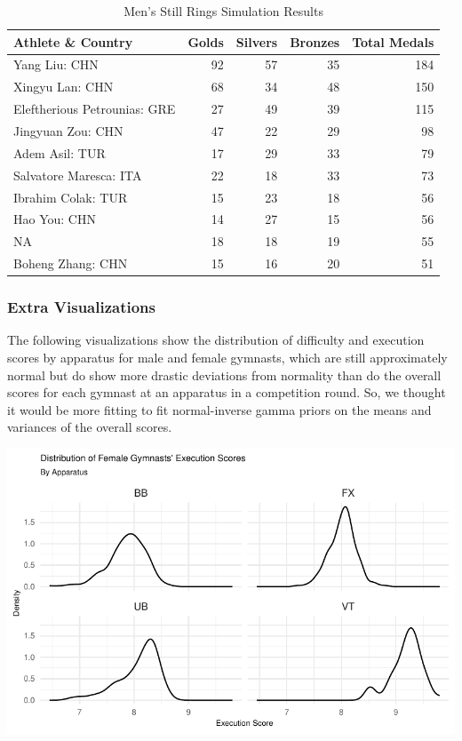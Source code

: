 \documentclass[
  letterpaper,
  DIV=11,
  numbers=noendperiod]{scrartcl}
\begin{document}
\begin{table}[H]

\caption{Men's Still Rings Simulation Results }
\centering
\fontsize{9}{11}\selectfont
\begin{tabular}[t]{l|r|r|r|r}
\hline
Athlete \& Country & Golds & Silvers & Bronzes & Total Medals\\
\hline
Yang Liu: CHN & 92 & 57 & 35 & 184\\
\hline
Xingyu Lan: CHN & 68 & 34 & 48 & 150\\
\hline
Eleftherious Petrounias: GRE & 27 & 49 & 39 & 115\\
\hline
Jingyuan Zou: CHN & 47 & 22 & 29 & 98\\
\hline
Adem Asil: TUR & 17 & 29 & 33 & 79\\
\hline
Salvatore Maresca: ITA & 22 & 18 & 33 & 73\\
\hline
Ibrahim Colak: TUR & 15 & 23 & 18 & 56\\
\hline
Hao You: CHN & 14 & 27 & 15 & 56\\
\hline
NA & 18 & 18 & 19 & 55\\
\hline
Boheng Zhang: CHN & 15 & 16 & 20 & 51\\
\hline
\end{tabular}
\end{table}

\hypertarget{extra-visualizations}{%
\subsubsection{Extra Visualizations}\label{extra-visualizations}}

The following visualizations show the distribution of difficulty and
execution scores by apparatus for male and female gymnasts, which are
still approximately normal but do show more drastic deviations from
normality than do the overall scores for each gymnast at an apparatus in
a competition round. So, we thought it would be more fitting to fit
normal-inverse gamma priors on the means and variances of the overall
scores.

\includegraphics{Main_files/figure-pdf/execution-difficulty-distributions-1.pdf}
\end{document}
